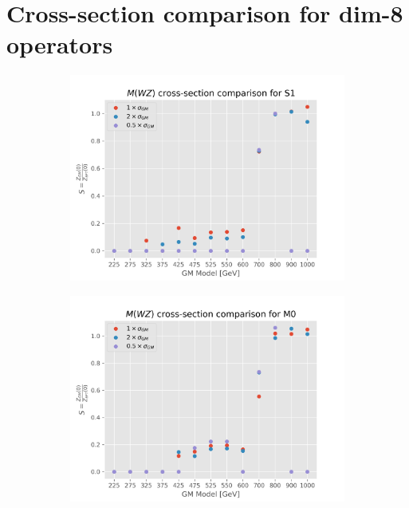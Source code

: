 \documentclass[../Bachelorarbeit.tex]{subfiles}
\begin{document}
\section{Cross-section comparison for dim-8 operators}
\label{sec:cross-section-comp}
\begin{figure}[h]
    \centering
    \begin{subfigure}{0.45\textwidth}
        \includegraphics[width=\textwidth]{Plots/gm_relevanze/MWZ_comparision_S1.png}
    \end{subfigure}
    \begin{subfigure}{0.45\textwidth}
        \includegraphics[width=\textwidth]{Plots/gm_relevanze/MWZ_comparision_M0.png}
    \end{subfigure}

\end{figure}
\end{document}
